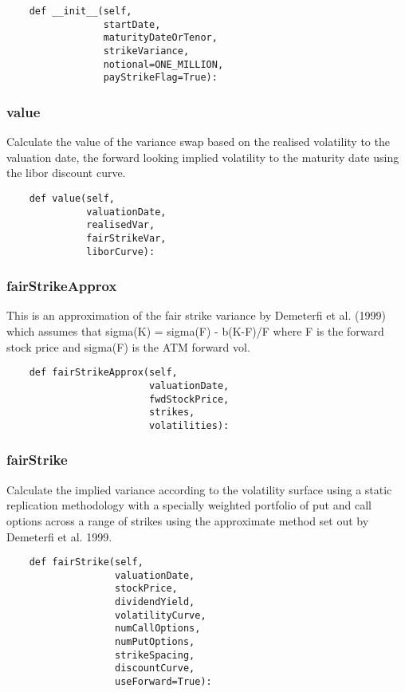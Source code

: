 \documentclass[twoside,11pt]{book}
\begin{document}
\begin{lstlisting}
    def __init__(self,
                 startDate,
                 maturityDateOrTenor,
                 strikeVariance,
                 notional=ONE_MILLION,
                 payStrikeFlag=True):
\end{lstlisting}

\subsubsection*{{\bf value}}
Calculate the value of the variance swap based on the realised volatility to the valuation date, the forward looking implied volatility to the maturity date using the libor discount curve.  

\begin{lstlisting}
    def value(self,
              valuationDate,
              realisedVar,
              fairStrikeVar,
              liborCurve):
\end{lstlisting}

\subsubsection*{{\bf fairStrikeApprox}}
This is an approximation of the fair strike variance by Demeterfi et al. (1999) which assumes that sigma(K) = sigma(F) - b(K-F)/F where F is the forward stock price and sigma(F) is the ATM forward vol.  

\begin{lstlisting}
    def fairStrikeApprox(self,
                         valuationDate,
                         fwdStockPrice,
                         strikes,
                         volatilities):
\end{lstlisting}

\subsubsection*{{\bf fairStrike}}
Calculate the implied variance according to the volatility surface using a static replication methodology with a specially weighted portfolio of put and call options across a range of strikes using the approximate method set out by Demeterfi et al. 1999.  

\begin{lstlisting}
    def fairStrike(self,
                   valuationDate,
                   stockPrice,
                   dividendYield,
                   volatilityCurve,
                   numCallOptions,
                   numPutOptions,
                   strikeSpacing,
                   discountCurve,
                   useForward=True):
\end{lstlisting}
\end{document}
